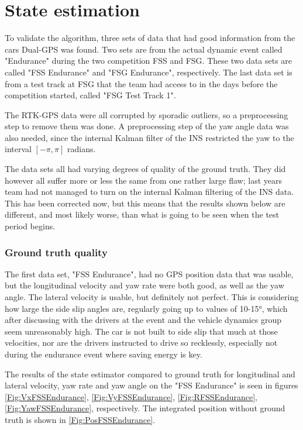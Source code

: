\section{State estimation}

To validate the algorithm, three sets of data that had good information from the cars Dual-\gls{GPS} was found. Two sets are from the actual dynamic event called "Endurance" during the two competition \gls{FSS} and \gls{FSG}. These two data sets are called "FSS Endurance" and "FSG Endurance", respectively. The last data set is from a test track at \gls{FSG} that the team had access to in the days before the competition started, called "FSG Test Track 1". 

The RTK-GPS data were all corrupted by sporadic outliers, so a preprocessing step to remove them was done. A preprocessing step of the yaw angle data was also needed, since the internal Kalman filter of the \gls{INS} restricted the yaw to the interval $[-\pi,\pi]$ radians. 

The data sets all had varying degrees of quality of the ground truth. They did however all suffer more or less the same from one rather large flaw; last years team had not managed to turn on the internal Kalman filtering of the \gls{INS} data. This has been corrected now, but this means that the results shown below are different, and most likely worse, than what is going to be seen when the test period begins.

\subsubsection{Ground truth quality}

The first data set, "FSS Endurance", had no \gls{GPS} position data that was usable, but the longitudinal velocity and yaw rate were both good, as well as the yaw angle. The lateral velocity is usable, but definitely not perfect. This is considering how large the side slip angles are, regularly going up to values of 10-15\si{\degree}, which after discussing with the drivers at the event and the vehicle dynamics group seem unreasonably high. The car is not built to side slip that much at those velocities, nor are the drivers instructed to drive so recklessly, especially not during the endurance event where saving energy is key. 

The results of the state estimator compared to ground truth for longitudinal  and lateral velocity, yaw rate and yaw angle on the "FSS Endurance" is seen in figures \ref{Fig:VxFSSEndurance}, \ref{Fig:VyFSSEndurance}, \ref{Fig:RFSSEndurance}, \ref{Fig:YawFSSEndurance}, respectively. The integrated position without ground truth is shown in \ref{Fig:PosFSSEndurance}. 

